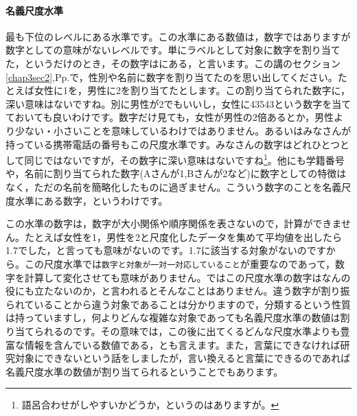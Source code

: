 \documentclass{ltjsbook}
\begin{document}
\paragraph{名義尺度水準}
最も下位のレベルにある水準です。この水準にある数値は，数字ではありますが数字としての意味がないレベルです。単にラベルとして対象に数字を割り当てた，というだけのとき，その数字はにある，と言います。この講のセクション\ref{chap3sec2},Pp.\pageref{chap3sec2}で，性別や名前に数字を割り当てたのを思い出してください。たとえば女性に1を，男性に2を割り当てたとします。この割り当てられた数字に，深い意味はないですね。別に男性が2でもいいし，女性に43543という数字を当てておいても良いわけです。数字だけ見ても，女性が男性の2倍あるとか，男性より少ない・小さいことを意味しているわけではありません。あるいはみなさんが持っている携帯電話の番号もこの尺度水準です。みなさんの数字はどれひとつとして同じではないですが，その数字に深い意味はないですね\footnote{語呂合わせがしやすいかどうか，というのはありますが。}。他にも学籍番号や，名前に割り当てられた数字(Aさんが1,Bさんが2など)に数字としての特徴はなく，ただの名前を簡略化したものに過ぎません。こういう数字のことを名義尺度水準にある数字，というわけです。

この水準の数字は，数字が大小関係や順序関係を表さないので，計算ができません。たとえば女性を1，男性を2と尺度化したデータを集めて平均値を出したら1.7でした，と言っても意味がないのです。1.7に該当する対象がないのですから。この尺度水準では\texttt{数字と対象が一対一対応していること}が重要なのであって，数字を計算して変化させても意味がありません。ではこの尺度水準の数字はなんの役にも立たないのか，と言われるとそんなことはありません。違う数字が割り振られていることから違う対象であることは分かりますので，分類するという性質は持っていますし，何よりどんな複雑な対象であっても名義尺度水準の数値は割り当てられるのです。その意味では，この後に出てくるどんな尺度水準よりも豊富な情報を含んでいる数値である，とも言えます。また，言葉にできなければ研究対象にできないという話をしましたが，言い換えると言葉にできるのであれば名義尺度水準の数値が割り当てられるということでもあります。
\end{document}
